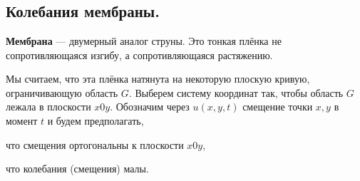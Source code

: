 \chapter{}
\label{lecture15}
\section{Колебания мембраны.}
\label{lecture15section1}
\begin{_def}
	\textbf{Мембрана} --- двумерный аналог струны. Это тонкая плёнка не сопротивляющаяся изгибу, а сопротивляющаяся растяжению.
\end{_def}
Мы считаем, что эта плёнка натянута на некоторую плоскую кривую, ограничивающую область $G$. Выберем систему координат так, чтобы область $G$ лежала в плоскости $x0y$. Обозначим через $u(x,y,t)$ смещение точки $x,y$ в момент $t$ и будем предполагать,
\begin{enumerate1}
	\item что смещения ортогональны к плоскости $x0y$,
	\item что колебания (смещения) малы.
\end{enumerate1}





